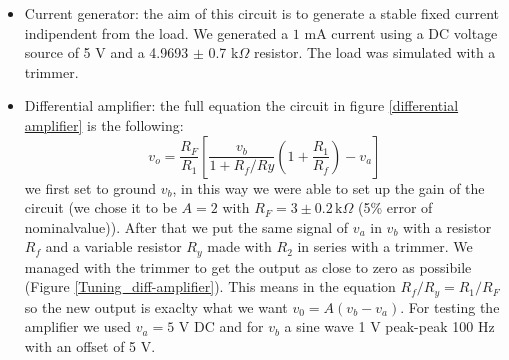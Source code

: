 \begin{itemize}
\item Current generator: the aim of this circuit is to generate a stable fixed current indipendent from the load. We generated a $1$ mA current using a DC voltage source of 5 V and a 4.9693 $\pm$ 0.7 k$\Omega$ resistor. The load was simulated with a trimmer. 
\item Differential amplifier: the full equation the circuit in figure \eqref{differential amplifier} is the following:
\[v_o = \frac{R_F}{R_1}\left[\frac{v_b}{1+R_f/Ry}\left(1+\frac{R_1}{R_f}\right)-v_a\right]\]
we first set to ground $v_b$, in this way we were able to set up the gain of the circuit (we chose it to be $A=2$ with $R_F =3\pm 0.2\, \text{k}\Omega$ (5\% error of nominalvalue)). After that we put the same signal of $v_a$ in $v_b$ with a resistor $R_f$ and a variable resistor $R_y$ made with $R_2$ in series with a trimmer. We managed with the trimmer to get the output as close to zero as possibile (Figure \eqref{Tuning_diff-amplifier}). This means in the equation $R_f/R_y = R_1/R_F$ so the new output is exaclty what we want $v_0 = A(v_b-v_a)$. For testing the amplifier we used $v_a= 5$ V DC and for $v_b$ a sine wave 1 V peak-peak 100 Hz with an offset of 5 V.
\end{itemize}

